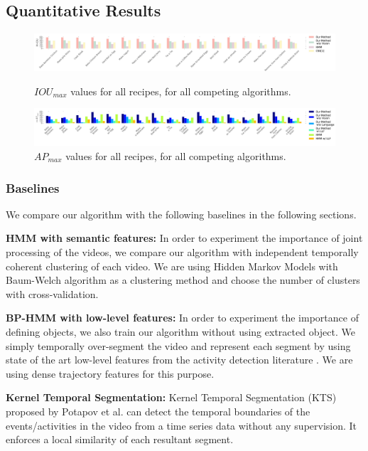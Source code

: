 \subsection{Quantitative Results}
\begin{figure}[t]
  \includegraphics[width=\textwidth]{miou}
  \caption{$IOU_{max}$ values for all recipes, for all competing algorithms.}
  \label{mIOU}
\includegraphics[width=\textwidth]{mmap}
\caption{$AP_{max}$ values for all recipes, for all competing algorithms.}
\label{mmAP}
\end{figure}

\subsubsection{Baselines}
We compare our algorithm with the following baselines in the following sections.

\noindent\textbf{HMM with semantic features:}
In order to experiment the importance of joint processing of the videos, we compare our algorithm with independent temporally coherent clustering of each video. We are using Hidden Markov Models with Baum-Welch algorithm\cite{rabiner} as a clustering method and choose the number of clusters with cross-validation.

\noindent\textbf{BP-HMM with low-level features:}
In order to experiment the importance of defining objects, we also train our algorithm without using extracted object. We simply temporally over-segment the video and represent each segment by using state of the art low-level features from the activity detection literature \cite{acticityFeature}. We are using dense trajectory features for this purpose.

\noindent\textbf{Kernel Temporal Segmentation\cite{potapov2014category}:}
Kernel Temporal Segmentation (KTS) proposed by Potapov et al.\cite{potapov2014category} can detect the temporal boundaries of the events/activities in the video from a time series data without any supervision. It enforces a local similarity of each resultant segment.

